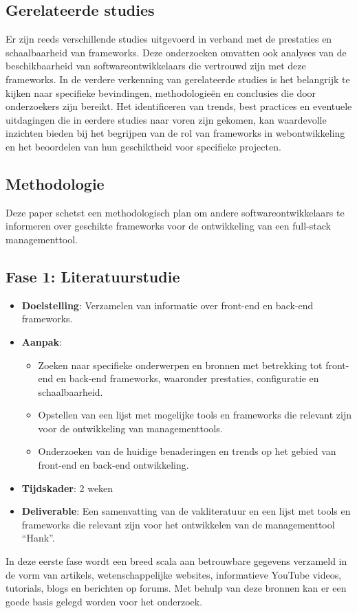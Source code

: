 \documentclass{hogent-article}
\begin{document}
\subsection{Ge\-rel\-at\-eerde studies}%
\label{sub:Gerelateerde_studies}
Er zijn reeds verschillende studies uitgevoerd in verband met de prestaties en schaalbaarheid van frameworks. Deze onderzoeken omvatten ook analyses van de beschikbaarheid van soft\-ware\-ont\-wik\-kel\-aars die vertrouwd zijn met deze frameworks.
\bigskip
In de verdere verkenning van ge\-rel\-a\-teer\-de studies is het belangrijk te kijken naar specifieke bevindingen, methodologieën en conclusies die door onderzoekers zijn bereikt. Het identificeren van trends, best practices en e\-ven\-tu\-ele uitdagingen die in eerdere studies naar voren zijn gekomen, kan waardevolle inzichten bieden bij het begrijpen van de rol van frameworks in webontwikkeling en het beoordelen van hun geschiktheid voor specifieke projecten.
\pagebreak
\subsection{Methodologie}
Deze paper schetst een methodologisch plan om andere softwareontwikkelaars te informeren over geschikte frameworks voor de ontwikkeling van een full-stack managementtool.
\subsection*{Fase 1: Literatuurstudie}
\begin{itemize}
\item \textbf{Doelstelling}: Verzamelen van informatie over front-end en back-end frameworks.
\item \textbf{Aanpak}:
\begin{itemize}
\item Zoeken naar specifieke onderwerpen en bronnen met betrekking tot front-end en back-end frameworks, waaronder prestaties, configuratie en schaalbaarheid.
\item Opstellen van een lijst met mogelijke tools en frameworks die relevant zijn voor de ontwikkeling van managementtools.
\item Onderzoeken van de huidige benaderingen en trends op het gebied van front-end en back-end ontwikkeling.
\end{itemize}
\item \textbf{Tijdskader}: 2 weken
\item \textbf{Deliverable}: Een samenvatting van de vakliteratuur en een lijst met tools en frameworks die relevant zijn voor het ontwikkelen van de man\-age\-ment\-tool ``Hank''.
\end{itemize}
\bigbreak
In deze eerste fase wordt een breed scala aan betrouwbare gegevens verzameld in de vorm van artikels, wetenschappelijke websites, informatieve YouTube videos, tutorials, blogs en berichten op forums. Met behulp van deze bronnen kan er een goede basis gelegd worden voor het onderzoek.
\end{document}
